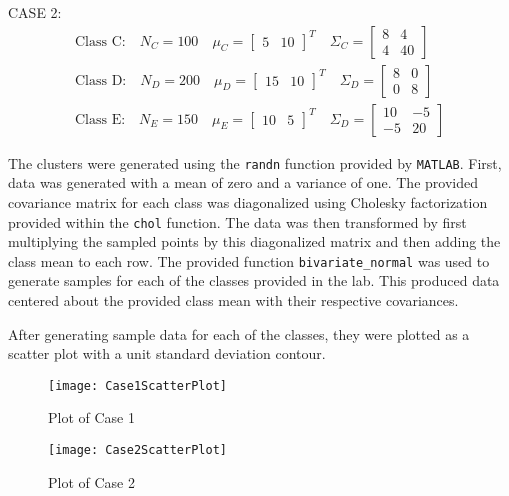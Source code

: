 \documentclass{article}
\begin{document}
CASE 2:
\begin{gather*}
\text{Class C:}\quad N_C = 100 \quad \mu_C = \begin{bmatrix} 5 & 10 \end{bmatrix}^T \quad \Sigma_C = \begin{bmatrix} 8 & 4 \\ 4 & 40  \end{bmatrix} \\
\text{Class D:}\quad N_D = 200 \quad \mu_D = \begin{bmatrix} 15 & 10 \end{bmatrix}^T \quad \Sigma_D = \begin{bmatrix} 8 & 0 \\ 0 & 8  \end{bmatrix} \\
\text{Class E:}\quad N_E = 150 \quad \mu_E = \begin{bmatrix} 10 & 5 \end{bmatrix}^T \quad \Sigma_D = \begin{bmatrix} 10 & -5 \\ -5 & 20  \end{bmatrix}
\end{gather*}

The clusters were generated using the \verb|randn| function provided by \verb|MATLAB|. First, data was generated with a mean of zero and a variance of one. The provided covariance matrix for each class was diagonalized using Cholesky factorization provided within the \verb|chol| function. The data was then transformed by first multiplying the sampled points by this diagonalized matrix and then adding the class mean to each row. The provided function \verb|bivariate_normal| was used to generate samples for each of the classes provided in the lab. This produced data centered about the provided class mean with their respective covariances.

After generating sample data for each of the classes, they were plotted as a scatter plot with a unit standard deviation contour.

\begin{figure}[H]
\caption{Plot of Case 1}
\centering
\texttt{[image: Case1ScatterPlot]}
\label{fig:Case1Scatter}
\end{figure}

\begin{figure}[H]
\caption{Plot of Case 2}
\centering
\texttt{[image: Case2ScatterPlot]}
\label{fig:Case2Scatter}
\end{figure}
\end{document}

